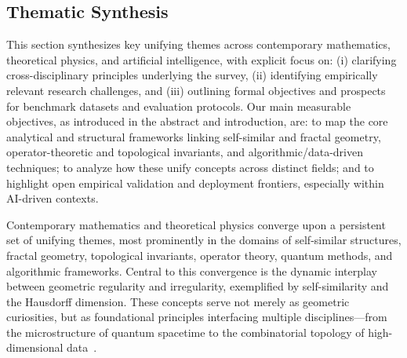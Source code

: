 \documentclass[sigconf]{acmart}
\begin{document}
\subsection{Thematic Synthesis}

This section synthesizes key unifying themes across contemporary mathematics, theoretical physics, and artificial intelligence, with explicit focus on: (i) clarifying cross-disciplinary principles underlying the survey, (ii) identifying empirically relevant research challenges, and (iii) outlining formal objectives and prospects for benchmark datasets and evaluation protocols. Our main measurable objectives, as introduced in the abstract and introduction, are: to map the core analytical and structural frameworks linking self-similar and fractal geometry, operator-theoretic and topological invariants, and algorithmic/data-driven techniques; to analyze how these unify concepts across distinct fields; and to highlight open empirical validation and deployment frontiers, especially within AI-driven contexts.

Contemporary mathematics and theoretical physics converge upon a persistent set of unifying themes, most prominently in the domains of self-similar structures, fractal geometry, topological invariants, operator theory, quantum methods, and algorithmic frameworks. Central to this convergence is the dynamic interplay between geometric regularity and irregularity, exemplified by self-similarity and the Hausdorff dimension. These concepts serve not merely as geometric curiosities, but as foundational principles interfacing multiple disciplines—from the microstructure of quantum spacetime to the combinatorial topology of high-dimensional data~\cite{ref5,ref7,ref8,ref10,ref11,ref19,ref20,ref22,ref24,ref25,ref26,ref30,ref35,ref36,ref37,ref38,ref39,ref40,ref51,ref54,ref55,ref56,ref57,ref58,ref59,ref60,ref61,ref62,ref63,ref64,ref65}.
\end{document}
